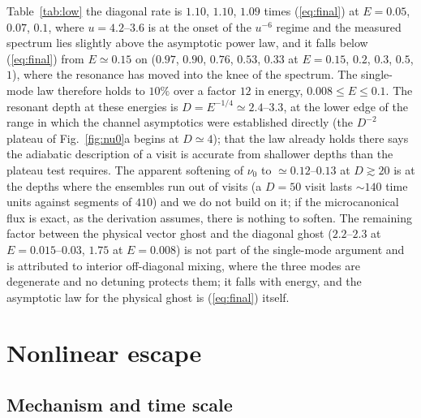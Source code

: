 \documentclass[11pt,a4paper]{article}
\begin{document}
Table~\ref{tab:low} the diagonal rate is $1.10$, $1.10$, $1.09$ times (\ref{eq:final}) at
$E=0.05$, $0.07$, $0.1$, where $u=4.2$--$3.6$ is at the onset of the $u^{-6}$ regime and the
measured spectrum lies slightly above the asymptotic power law, and it falls below
(\ref{eq:final}) from $E\simeq0.15$ on ($0.97$, $0.90$, $0.76$, $0.53$, $0.33$ at $E=0.15$,
$0.2$, $0.3$, $0.5$, $1$), where the resonance has moved into the knee of the spectrum. The
single-mode law therefore holds to $10\%$ over a factor $12$ in energy, $0.008\le E\le0.1$. The resonant depth
at these energies is $D=E^{-1/4}\simeq2.4$--$3.3$, at the lower edge of the range in which the
channel asymptotics were established directly (the $D^{-2}$ plateau of Fig.~\ref{fig:nu0}a
begins at $D\simeq4$); that the law already holds there says the adiabatic description of a visit
is accurate from shallower depths than the plateau test requires. The apparent softening of
$\nu_0$ to $\simeq0.12$--$0.13$ at $D\gtrsim20$ is at the depths where the ensembles run out of
visits (a $D=50$ visit lasts $\sim140$ time units against segments of $410$) and we do not build
on it; if the microcanonical flux is exact, as the derivation assumes, there is nothing to
soften. The remaining factor between the physical vector ghost and the diagonal ghost
($2.2$--$2.3$ at $E=0.015$--$0.03$, $1.75$ at $E=0.008$) is not part of the single-mode argument
and is attributed to interior off-diagonal mixing, where the three modes are degenerate and no
detuning protects them; it falls with energy, and the asymptotic law for the physical ghost is
(\ref{eq:final}) itself.

\section{Nonlinear escape}
\label{sec:nonlinear}

\subsection{Mechanism and time scale}
\end{document}

